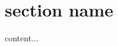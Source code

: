 \documentclass{beamer}
\begin{document}
\section{section name}

\begin{frame}
content...
\end{frame}
\end{document}
